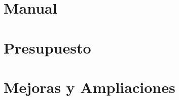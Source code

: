 \documentclass[a4paper]{article}
\begin{document}
	

    \section{Manual}
    
    \section{Presupuesto} \label{sec:budget}

    \section{Mejoras y Ampliaciones}
    
    
    
    
\end{document}
